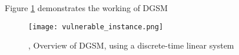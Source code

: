 Figure \ref{fig:vuln_ins} demonstrates the working of DGSM
\begin{figure}[H]
  \centering
  \texttt{[image: vulnerable\_instance.png]}
  \caption{\cite{10383531}, 
  Overview of DGSM, using a discrete-time linear system%
  }
  \label{fig:vuln_ins}
\end{figure}

